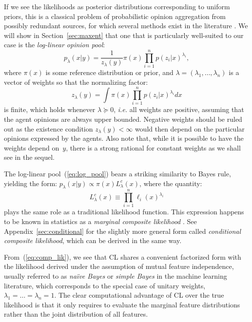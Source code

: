 \documentclass[english]{scrartcl}
\begin{document}
If we see the likelihoods as posterior distributions corresponding to uniform priors, this is a classical problem of probabilistic opinion aggregation from possibly redundant sources, for which several methods exist in the literature \cite{Tarantola-82,Genest-86,Garg-04,Allard-12}. We will show in Section~\ref{sec:maxent} that one that is particularly well-suited to our case is the {\em log-linear opinion pool}: 
\begin{equation}
\label{eq:log_pool}
p_\lambda(x|y) = \frac{1}{z_\lambda(y)} \pi(x) \prod_{i=1}^n p(z_i|x)^{\lambda_i},
\end{equation} 
where $\pi(x)$ is some reference distribution or prior, and $\lambda=(\lambda_1,\ldots,\lambda_n)$ is a vector of weights so that the normalizing factor:
$$
z_\lambda(y) = \int \pi(x) \prod_{i=1}^n p(z_i|x)^{\lambda_i} dx
$$
is finite, which holds whenever $\lambda\succeq 0$, {\em i.e.} all weights are positive, assuming that the agent opinions are always upper bounded. Negative weights should be ruled out as the existence condition $z_\lambda(y)<\infty$ would then depend on the particular opinions expressed by the agents. Also note that, while it is possible to have the weights depend on~$y$, there is a strong rational for constant weights as we shall see in the sequel. 



The log-linear pool~(\ref{eq:log_pool}) bears a striking similarity to Bayes rule, yielding the form: $p_\lambda(x|y)\propto \pi(x) L^c_\lambda(x)$, where the quantity:
\begin{equation}
\label{eq:comp_lik}
L^c_\lambda(x) \equiv \prod_{i=1}^n \ell_i (x)^{\lambda_i}
\end{equation} 
plays the same role as a traditional likelihood function. This expression happens to be known in statistics as a {\em marginal composite likelihood} \cite{Varin-11}. See Appendix~\ref{sec:conditional} for the slightly more general form called {\em conditional composite likelihood}, which can be derived in the same way.

From~(\ref{eq:comp_lik}), we see that CL shares a convenient factorized form with the likelihood derived under the assumption of mutual feature independence, usually referred to as {\em na\"ive Bayes} or {\em simple Bayes} in the machine learning literature, which corresponds to the special case of unitary weights, $\lambda_1=\ldots=\lambda_n= 1$. The clear computational advantage of CL over the true likelihood is that it only requires to evaluate the marginal feature distributions rather than the joint distribution of all features.
\end{document}
